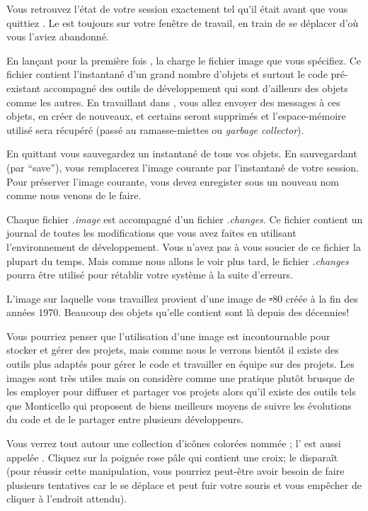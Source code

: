 \documentclass[a4paper,10pt,twoside]{book}
\begin{document}

Vous retrouvez l'état de votre session exactement tel qu'il était
avant que vous quittiez \sq. Le \blobmorph est toujours sur votre
fenêtre de travail, en train de se déplacer d'o\`u vous l'aviez abandonné.

En lançant pour la première fois \sq, la 
charge le fichier image que vous spécifiez. Ce fichier contient
l'instantané d'un grand nombre d'objets et surtout le code
pré-existant accompagné des outils de développement qui sont
d'ailleurs des objets comme les autres. En travaillant dans \sq, vous
allez envoyer des messages à ces objets, en créer de nouveaux, et
certains seront supprimés et l'espace-mémoire utilisé sera récupéré
(\ie pass\'e au ramasse-miettes ou \emph{garbage collector}).

En quittant \sq vous sauvegardez un instantané de tous vos objets. En sauvegardant (par ``save''), vous remplacerez l'image courante par l'instantané de votre session. Pour préserver l'image courante, vous devez enregister sous un nouveau nom comme nous venons de le faire.

Chaque fichier \emph{.image} est accompagné d'un fichier \emph{.changes}.
Ce fichier contient un journal de toutes les modifications que vous avez faites en utilisant l'environnement de développement.
Vous n'avez pas à vous soucier de ce fichier la plupart du temps.
Mais comme nous allons le voir plus tard, le fichier \emph{.changes} pourra être utilisé pour rétablir votre système \sq à la suite d'erreurs.

L'image sur laquelle vous travaillez provient d'une image de \st-80 créée à la fin des années 1970.
Beaucoup des objets qu'elle contient sont là depuis des décennies!

Vous pourriez penser que l'utilisation d'une image est incontournable pour stocker et gérer des projets, mais comme nous le verrons bientôt il existe des outils plus adaptés pour gérer le code et travailler en équipe sur des projets.
Les images sont très utiles mais on considère comme une pratique plutôt brusque de les employer pour diffuser et partager vos projets alors qu'il existe des outils tels que Monticello qui proposent de biens meilleurs moyens de suivre les évolutions du code et de le partager entre plusieurs développeurs.


Vous verrez tout autour une collection d'icônes colorées nomm\'ee
; l'
 est aussi appel\'ee .
Cliquez sur la poignée rose p\^ale qui contient une croix; le
\blobmorph disparaît (pour réussir cette manipulation, vous pourriez
peut-être avoir besoin de faire plusieurs tentatives car le \blobmorph
se déplace et peut fuir votre souris et vous empêcher de cliquer à
l'endroit attendu).
\end{document}
